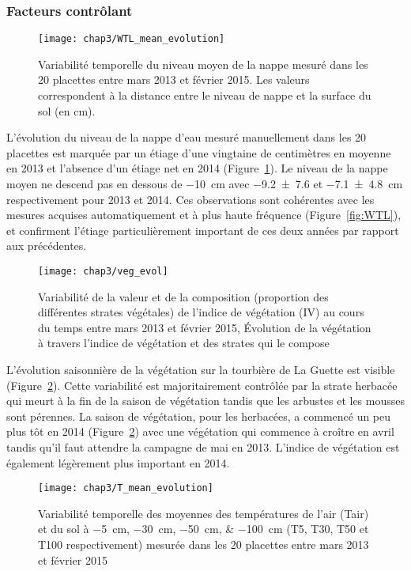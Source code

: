 \subsubsection{Facteurs contrôlant}

\begin{figure}
\centering
\texttt{[image: chap3/WTL\_mean\_evolution]}
\caption{Variabilité temporelle du niveau moyen de la nappe mesuré dans les 20 placettes entre mars 2013 et février 2015. Les valeurs correspondent à la distance entre le niveau de nappe et la surface du sol (en cm).}
\label{fig:WTL_mean_evolution}
\end{figure}

L'évolution du niveau de la nappe d'eau mesuré manuellement dans les 20 placettes est marquée par un étiage d'une vingtaine de centimètres en moyenne en 2013 et l'absence d'un étiage net en 2014 (Figure~\ref{fig:WTL_mean_evolution}).
Le niveau de la nappe moyen ne descend pas en dessous de \SI{-10}{\cm} avec \num{-9.2(76)} et \SI{-7.1(48)}{\centi\metre} respectivement pour 2013 et 2014.
Ces observations sont cohérentes avec les mesures acquises automatiquement et à plus haute fréquence (Figure~\ref{fig:WTL}), et confirment l'étiage particulièrement important de ces deux années par rapport aux précédentes.

\begin{figure}
\centering
\texttt{[image: chap3/veg\_evol]}
\caption{Variabilité de la valeur et de la composition (proportion des différentes strates végétales) de l'indice de végétation (IV) au cours du temps entre mars 2013 et février 2015, 
Évolution de la végétation à travers l'indice de végétation et des strates qui le compose}
\label{fig:veg_evol}
\end{figure}

L'évolution saisonnière de la végétation sur la tourbière de La Guette est visible (Figure~\ref{fig:veg_evol}).
Cette variabilité est majoritairement contrôlée par la strate herbacée qui meurt à la fin de la saison de végétation tandis que les arbustes et les mousses sont pérennes.
La saison de végétation, pour les herbacées, a commencé un peu plus tôt en 2014 (Figure~\ref{fig:veg_evol}) avec une végétation qui commence à croître en avril tandis qu'il faut attendre la campagne de mai en 2013.
L'indice de végétation est également légèrement plus important en 2014.

\begin{figure}
\centering
\texttt{[image: chap3/T\_mean\_evolution]}
\caption{Variabilité temporelle des moyennes des températures de l'air (Tair) et du sol à \SIlist{-5;-30;-50;-100}{\centi\metre} (T5, T30, T50 et T100 respectivement) mesurée dans les 20 placettes entre mars 2013 et février 2015}
\label{fig:T_mean_evolution}
\end{figure}

